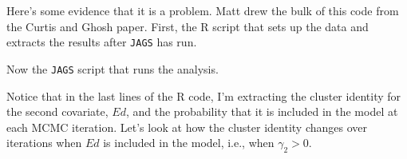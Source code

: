 \documentclass[12pt]{article}\usepackage[]{graphicx}\usepackage[]{color}
\begin{document}
Here's some evidence that it is a problem. Matt drew the bulk of this
code from the Curtis and Ghosh paper. First, the R script that sets up
the data and extracts the results after {\tt JAGS} has run.



\noindent Now the {\tt JAGS} script that runs the analysis.



\noindent Notice that in the last lines of the R code, I'm extracting
the cluster identity for the second covariate, $Ed$, and the probability
that it is included in the model at each MCMC iteration. Let's look at
how the cluster identity changes over iterations when $Ed$ is included
in the model, i.e., when $\gamma_2 > 0$.
\end{document}
